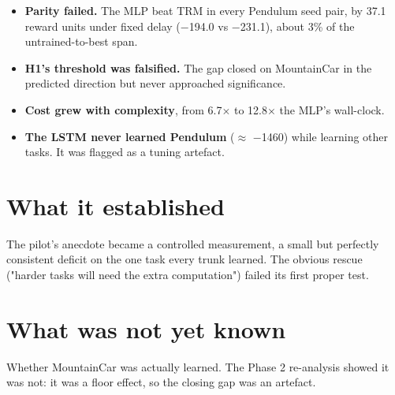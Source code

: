 \documentclass[11pt]{article}
\begin{document}
\begin{itemize}
\item \textbf{Parity failed.} The MLP beat TRM in every Pendulum seed pair, by 37.1 reward units under fixed delay ($-$194.0 vs $-$231.1), about 3\% of the untrained-to-best span.
\item \textbf{H1's threshold was falsified.} The gap closed on MountainCar in the predicted direction but never approached significance.
\item \textbf{Cost grew with complexity}, from 6.7$\times$ to 12.8$\times$ the MLP's wall-clock.
\item \textbf{The LSTM never learned Pendulum} ($\approx$ $-$1460) while learning other tasks. It was flagged as a tuning artefact.
\end{itemize}



\section*{What it established}



The pilot's anecdote became a controlled measurement, a small but perfectly consistent deficit on the one task every trunk learned. The obvious rescue ("harder tasks will need the extra computation") failed its first proper test.



\section*{What was not yet known}



Whether MountainCar was actually learned. The Phase 2 re-analysis showed it was not: it was a floor effect, so the closing gap was an artefact.
\end{document}
